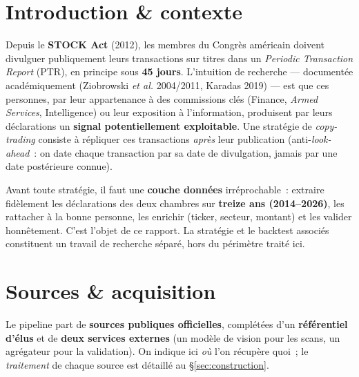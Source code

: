 \documentclass[11pt,a4paper]{article}
\begin{document}
\section{Introduction \& contexte}
Depuis le \textbf{STOCK Act} (2012), les membres du Congrès américain doivent divulguer publiquement
leurs transactions sur titres dans un \emph{Periodic Transaction Report} (PTR), en principe sous
\textbf{45 jours}. L'intuition de recherche — documentée académiquement (Ziobrowski \emph{et al.}
2004/2011, Karadas 2019) — est que ces personnes, par leur appartenance à des commissions clés
(Finance, \emph{Armed Services}, Intelligence) ou leur exposition à l'information, produisent par leurs
déclarations un \textbf{signal potentiellement exploitable}. Une stratégie de \emph{copy-trading}
consiste à répliquer ces transactions \emph{après} leur publication (anti-\emph{look-ahead}~: on date
chaque transaction par sa date de divulgation, jamais par une date postérieure connue).

Avant toute stratégie, il faut une \textbf{couche données} irréprochable~: extraire fidèlement les
déclarations des deux chambres sur \textbf{treize ans (2014--2026)}, les rattacher à la bonne personne,
les enrichir (ticker, secteur, montant) et les valider honnêtement. C'est l'objet de ce rapport. La
stratégie et le backtest associés constituent un travail de recherche séparé, hors du périmètre traité
ici.

\section{Sources \& acquisition}
\label{sec:sources}

Le pipeline part de \textbf{sources publiques officielles}, complétées d'un \textbf{référentiel d'élus}
et de \textbf{deux services externes} (un modèle de vision pour les scans, un agrégateur pour la
validation). On indique ici \emph{où} l'on récupère quoi~; le \emph{traitement} de chaque source est
détaillé au \S{}\ref{sec:construction}.
\end{document}
